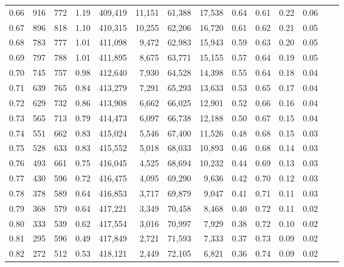 \begin{tabular}{rrrrrrrrrrrrrr}
0.66 &     916 &    772 &    1.19 &  409,419 &   11,151 &  61,388 &  17,538 &  0.64 &  0.61 &  0.22 &      0.06 \\
0.67 &     896 &    818 &    1.10 &  410,315 &   10,255 &  62,206 &  16,720 &  0.61 &  0.62 &  0.21 &      0.05 \\
0.68 &     783 &    777 &    1.01 &  411,098 &    9,472 &  62,983 &  15,943 &  0.59 &  0.63 &  0.20 &      0.05 \\
0.69 &     797 &    788 &    1.01 &  411,895 &    8,675 &  63,771 &  15,155 &  0.57 &  0.64 &  0.19 &      0.05 \\
0.70 &     745 &    757 &    0.98 &  412,640 &    7,930 &  64,528 &  14,398 &  0.55 &  0.64 &  0.18 &      0.04 \\
0.71 &     639 &    765 &    0.84 &  413,279 &    7,291 &  65,293 &  13,633 &  0.53 &  0.65 &  0.17 &      0.04 \\
0.72 &     629 &    732 &    0.86 &  413,908 &    6,662 &  66,025 &  12,901 &  0.52 &  0.66 &  0.16 &      0.04 \\
0.73 &     565 &    713 &    0.79 &  414,473 &    6,097 &  66,738 &  12,188 &  0.50 &  0.67 &  0.15 &      0.04 \\
0.74 &     551 &    662 &    0.83 &  415,024 &    5,546 &  67,400 &  11,526 &  0.48 &  0.68 &  0.15 &      0.03 \\
0.75 &     528 &    633 &    0.83 &  415,552 &    5,018 &  68,033 &  10,893 &  0.46 &  0.68 &  0.14 &      0.03 \\
0.76 &     493 &    661 &    0.75 &  416,045 &    4,525 &  68,694 &  10,232 &  0.44 &  0.69 &  0.13 &      0.03 \\
0.77 &     430 &    596 &    0.72 &  416,475 &    4,095 &  69,290 &   9,636 &  0.42 &  0.70 &  0.12 &      0.03 \\
0.78 &     378 &    589 &    0.64 &  416,853 &    3,717 &  69,879 &   9,047 &  0.41 &  0.71 &  0.11 &      0.03 \\
0.79 &     368 &    579 &    0.64 &  417,221 &    3,349 &  70,458 &   8,468 &  0.40 &  0.72 &  0.11 &      0.02 \\
0.80 &     333 &    539 &    0.62 &  417,554 &    3,016 &  70,997 &   7,929 &  0.38 &  0.72 &  0.10 &      0.02 \\
0.81 &     295 &    596 &    0.49 &  417,849 &    2,721 &  71,593 &   7,333 &  0.37 &  0.73 &  0.09 &      0.02 \\
0.82 &     272 &    512 &    0.53 &  418,121 &    2,449 &  72,105 &   6,821 &  0.36 &  0.74 &  0.09 &      0.02 \\

\end{tabular}
